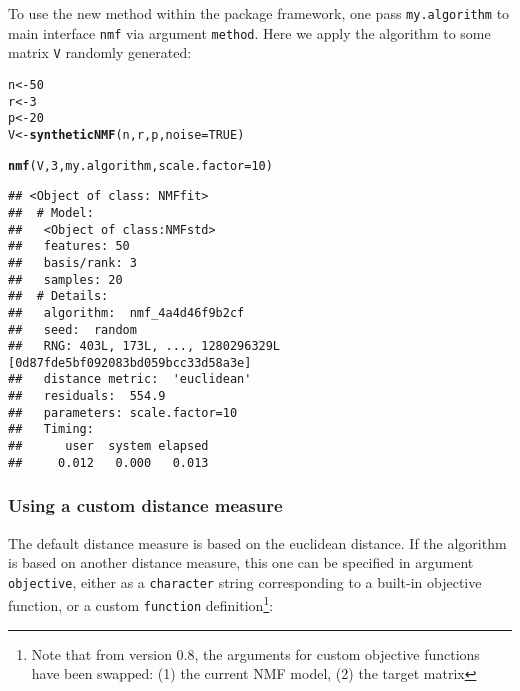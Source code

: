 \documentclass[a4paper]{article}\usepackage{graphicx, color}
\makeatletter
\newcommand{\hlfunctioncall}[1]{\textcolor[rgb]{0.501960784313725,0,0.329411764705882}{\textbf{#1}}}%
\newenvironment{kframe}{%
 \def\at@end@of@kframe{}%
 \ifinner\ifhmode%
  \def\at@end@of@kframe{\end{minipage}}%
  \begin{minipage}{\columnwidth}%
 \fi\fi%
 \def\FrameCommand##1{\hskip\@totalleftmargin \hskip-\fboxsep
 \colorbox{shadecolor}{##1}\hskip-\fboxsep
     \hskip-\linewidth \hskip-\@totalleftmargin \hskip\columnwidth}%
 \MakeFramed {\advance\hsize-\width
   \@totalleftmargin\z@ \linewidth\hsize
   \@setminipage}}%
 {\par\unskip\endMakeFramed%
 \at@end@of@kframe}
\newenvironment{knitrout}{}{} %
\let\code=\texttt
\makeatother
\begin{document}
To use the new method within the package framework, one pass \code{my.algorithm} to main interface \code{nmf} via argument \code{method}. 
Here we apply the algorithm to some matrix \code{V} randomly generated: 

\begin{knitrout}
\color{fgcolor}\begin{kframe}
\begin{alltt}
n <- 50
r <- 3
p <- 20
V <- \hlfunctioncall{syntheticNMF}(n, r, p, noise = TRUE)
\end{alltt}
\end{kframe}
\end{knitrout}


\begin{knitrout}
\color{fgcolor}\begin{kframe}
\begin{alltt}
\hlfunctioncall{nmf}(V, 3, my.algorithm, scale.factor = 10)
\end{alltt}
\begin{verbatim}
## <Object of class: NMFfit>
##  # Model:
##   <Object of class:NMFstd>
##   features: 50 
##   basis/rank: 3 
##   samples: 20 
##  # Details:
##   algorithm:  nmf_4a4d46f9b2cf 
##   seed:  random 
##   RNG: 403L, 173L, ..., 1280296329L [0d87fde5bf092083bd059bcc33d58a3e]
##   distance metric:  'euclidean' 
##   residuals:  554.9 
##   parameters: scale.factor=10 
##   Timing:
##      user  system elapsed 
##     0.012   0.000   0.013
\end{verbatim}
\end{kframe}
\end{knitrout}


\subsubsection{Using a custom distance measure}
The default distance measure is based on the euclidean distance. 
If the algorithm is based on another distance measure, this one can be specified in argument \code{objective}, either as a \code{character} string corresponding to a built-in objective function, or a custom \code{function} definition\footnote{Note that from version 0.8, the arguments for custom objective functions have been swapped: (1) the current NMF model, (2) the target matrix}:
\end{document}
